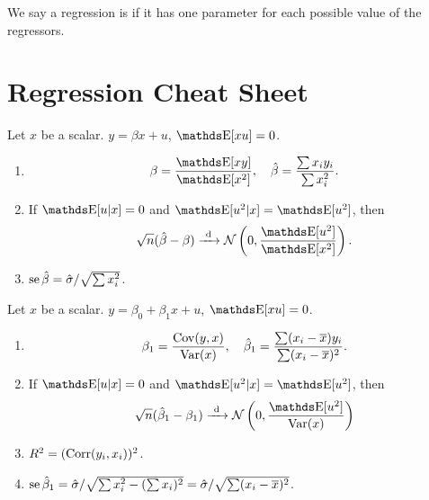 \documentclass[letterpaper, 10pt]{article}
\begin{document}
\begin{definition}
  We say a regression is  if it has one parameter for each possible value of the regressors.
\end{definition}


\section{Regression Cheat Sheet}
\begin{tcolorbox}
Let \(x\) be a scalar.
\(y = \beta x + u\), \(\E[xu] = 0\).
\end{tcolorbox}
\begin{enumerate}[label=(\roman*)]
  \item 
    \[
      \beta = \frac{\E[xy]}{\E[x^2]}, \quad
      \hat{\beta} = \frac{\sum x_i y_i}{\sum x_i^2}.
    \]
  \item If \(\E[u|x] = 0\) and \(\E[u^2|x] = \E[u^2]\), then
    \[
      \sqrt{n} (\hat{\beta} - \beta)
      \longdistto \Normal\left(0, \frac{\E[u^2]}{\E[x^2]}\right).
    \]
  \item \(\operatorname{se} \hat{\beta} = \hat{\sigma} / \sqrt{\sum x_i^2}\).
\end{enumerate}

\begin{tcolorbox}
Let \(x\) be a scalar.
\(y = \beta_0 + \beta_1 x + u\), \(\E[xu] = 0\).
\end{tcolorbox}
\begin{enumerate}[label=(\roman*)]
  \item
    \[
      \beta_1
      = \frac{\operatorname{Cov}(y, x)}{\operatorname{Var}(x)}, \quad
      \hat{\beta}_1
      = \frac{\sum (x_i - \overline{x}) y_i}{\sum (x_i - \overline{x})^2}.
    \]
  \item If \(\E[u|x] = 0\) and \(\E[u^2 | x] = \E[u^2]\), then
    \[
      \sqrt{n} (\hat{\beta}_1 - \beta_1)
      \longdistto \Normal\left( 0, \frac{\E[u^2]}{\Var(x)} \right) 
    \]
  \item \(R^2 = (\operatorname{Corr}(y_i, x_i))^2\).
  \item \(\operatorname{se} \hat{\beta}_1 = \hat{\sigma} / \sqrt{\sum x_i^2 - (\sum x_i)^2} = \hat{\sigma} / \sqrt{\sum (x_i - \overline{x})^2}\).
\end{enumerate}
\end{document}
